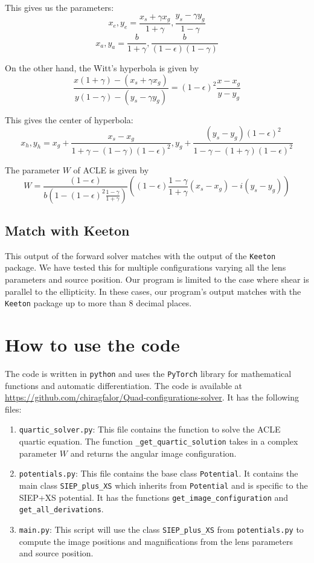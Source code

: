 \documentclass{article}
\begin{document}
This gives us the parameters:
$$ x_e, y_e = \frac{x_s+\gamma x_g}{1+\gamma}, \frac{y_s-\gamma y_g}{1-\gamma} $$
$$ x_a, y_a = \frac{b}{1+\gamma}, \frac{b}{(1-\epsilon)(1-\gamma)} $$

On the other hand, the Witt's hyperbola is given by
$$ \frac{x(1+\gamma) - (x_s +\gamma x_g)}{y(1-\gamma) - (y_s - \gamma y_g)} =(1-\epsilon)^2\frac{x-x_g}{y-y_g} $$

This gives the center of hyperbola:
$$ x_h, y_h = x_g + \frac{x_s - x_g}{1+\gamma -(1-\gamma)(1-\epsilon)^2}, y_g + \frac{(y_s - y_g)(1-\epsilon)^2}{1-\gamma -(1+\gamma)(1-\epsilon)^2} $$

The parameter $W$ of ACLE is given by
$$ W = \frac{(1-\epsilon)}{b\left(1-(1-\epsilon)^2\frac{1-\gamma}{1+\gamma}\right)} \left( (1-\epsilon)\frac{1-\gamma}{1+\gamma}(x_s-x_g) -i (y_s-y_g) \right) $$

\subsection{Match with Keeton}
This output of the forward solver matches with the output of the \texttt{Keeton} package. We have tested this for multiple configurations varying all the lens parameters and source position. Our program is limited to the case where shear is parallel to the ellipticity. In these cases, our program's output matches with the \texttt{Keeton} package up to more than 8 decimal places.

\appendix

\section{How to use the code}
The code is written in \texttt{python} and uses the \texttt{PyTorch} library for mathematical functions and automatic differentiation. The code is available at \url{https://github.com/chiragfalor/Quad-configurations-solver}. It has the following files:
\begin{enumerate}
    \item \texttt{quartic\_solver.py}: This file contains the function to solve the ACLE quartic equation. The function \texttt{\_get\_quartic\_solution} takes in a complex parameter $W$ and returns the angular image configuration.\\
    \item \texttt{potentials.py}: This file contains the base class \texttt{Potential}. It contains the main class \texttt{SIEP\_plus\_XS} which inherits from \texttt{Potential} and is specific to the SIEP+XS potential. It has the functions \texttt{get\_image\_configuration} and \texttt{get\_all\_derivations}.\\
    \item \texttt{main.py}: This script will use the class \texttt{SIEP\_plus\_XS} from \texttt{potentials.py} to compute the image positions and magnifications from the lens parameters and source position.
\end{enumerate}
\end{document}
